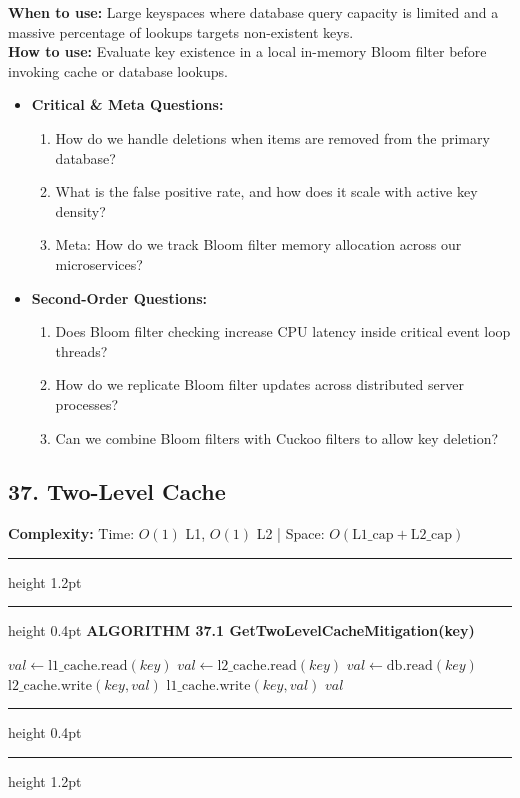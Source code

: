 \documentclass[11pt,a4paper]{article}
\newenvironment{textbookalgo}[2]{%
  \par\addvspace{1.2em}\noindent
  \hrule height 1.2pt
  \vspace{1.5pt}
  \hrule height 0.4pt
  \vspace{5pt}
  {\noindent\large\bfseries\sffamily ALGORITHM #1 \quad #2}
  \par\vspace{5pt}
  \RestyleAlgo{plain}
}{%
  \par\vspace{4pt}
  \hrule height 0.4pt
  \vspace{1.5pt}
  \hrule height 1.2pt
  \par\addvspace{1.2em}
}
\theoremstyle{definition}
\begin{document}
\noindent
\textbf{When to use:} Large keyspaces where database query capacity is limited and a massive percentage of lookups targets non-existent keys.\\
\textbf{How to use:} Evaluate key existence in a local in-memory Bloom filter before invoking cache or database lookups.
\begin{itemize}[leftmargin=*]
  \item[] \textbf{Critical \& Meta Questions:}
  \begin{enumerate}
    \item How do we handle deletions when items are removed from the primary database?
    \item What is the false positive rate, and how does it scale with active key density?
    \item Meta: How do we track Bloom filter memory allocation across our microservices?
  \end{enumerate}
  \item[] \textbf{Second-Order Questions:}
  \begin{enumerate}
    \item Does Bloom filter checking increase CPU latency inside critical event loop threads?
    \item How do we replicate Bloom filter updates across distributed server processes?
    \item Can we combine Bloom filters with Cuckoo filters to allow key deletion?
  \end{enumerate}
\end{itemize}
\medskip


\clearpage
\subsection{37. Two-Level Cache}

\noindent
\textbf{Complexity:} Time: $O(1)$ L1, $O(1)$ L2 | Space: $O(\text{L1\_cap} + \text{L2\_cap})$
\smallskip

\begin{textbookalgo}{37.1}{GetTwoLevelCacheMitigation(key)}
\begin{algorithm}[H]
$val \leftarrow \text{l1\_cache.read}(key)$\;
$val \leftarrow \text{l2\_cache.read}(key)$\;
$val \leftarrow \text{db.read}(key)$\;
$\text{l2\_cache.write}(key, val)$\;
$\text{l1\_cache.write}(key, val)$\;
\Return $val$\;
\end{algorithm}
\end{textbookalgo}
\end{document}
